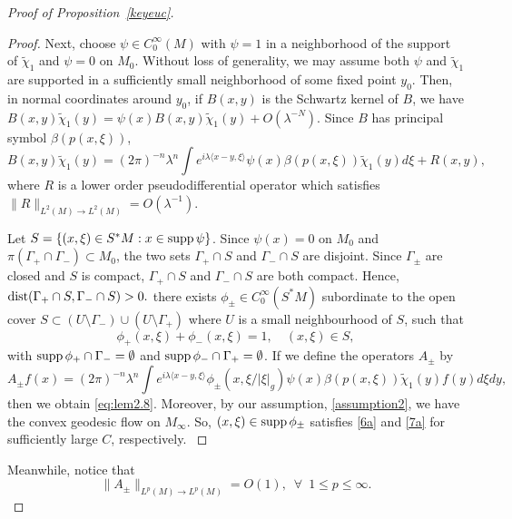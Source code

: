 \documentclass[11pt]{amsart}
\newcommand{\la}{\lambda}
\begin{document}
\begin{proof}[Proof of Proposition~\ref{keyeuc}]
\begin{proof}
Next, choose $\psi\in C_0^\infty{(M)}$ with $\psi=1$ in a neighborhood of the support of $\tilde\chi_1$  and $\psi=0$ on $M_0$. Without loss of generality, we may assume both $\psi$ and $\tilde \chi_1$ are supported in a sufficiently small neighborhood of some fixed point $y_0$. Then, in normal coordinates around $y_0$, if $B(x,y)$ is the {Schwartz} kernel of $B$, 
we have $B(x,y)\tilde\chi_1(y)=\psi(x)B(x,y)\tilde \chi_1(y)+O(\la^{-N})$. {Since $B$ has principal symbol $\beta(p(x,\xi))$},
\begin{equation}\label{2.95a}
    B(x,y)\tilde\chi_1(y)=(2\pi)^{-n}\la^n\int e^{i\la\langle x-y,\xi \rangle} \psi(x){\beta(p(x,\xi))}\tilde\chi_1(y)d\xi +R(x,y),
\end{equation}
where $R$ is a lower order {pseudodifferential} operator which satisfies $ \|R\|_{L^2(M)\to L^2(M)}=O(\la^{-1})
$.

{Let $S=\{(x,\xi)\in S^*M: x\in \textnormal{supp}\,\psi \}$. 
Since $\psi(x)=0$ on $M_0$ and $\pi(\Gamma_+\cap \Gamma_-)\subset M_0$, the two sets $\Gamma_+\cap S$ and $\Gamma_-\cap S$ are disjoint. Since $\Gamma_\pm$ are closed and $S$ is compact, $\Gamma_+\cap S$ and $\Gamma_-\cap S$ are both compact. Hence, $\textnormal{dist}(\Gamma_+\cap S,\Gamma_-\cap S)>0.$
there exists $\phi_{\pm}\in C_0^{\infty}(S^*M)$ subordinate to the open cover $S\subset (U\setminus \Gamma_-)\cup (U\setminus \Gamma_+)$ where $U$ is a small neighbourhood of $S$, such that
\begin{equation}
    \phi_+(x,\xi) +\phi_-(x,\xi) =1,\quad (x,\xi)\in S,
\end{equation}
with $\textnormal{supp}\,\phi_+ \cap \Gamma_-=\emptyset$ 
 and $\textnormal{supp}\,\phi_- \cap \Gamma_+=\emptyset$. If we define the operators $A_\pm$ by 
\begin{equation}\label{10}
   A_\pm f(x)=(2\pi)^{-n}\la^n\int e^{i\la\langle x-y,\xi \rangle} \phi_{\pm}(x,\xi/|\xi|_g)\psi(x)\beta(p(x,\xi))\tilde\chi_1(y) f(y)d\xi dy,
\end{equation}
then we obtain \eqref{eq:lem2.8}. Moreover, by our assumption, \eqref{assumption2}, we have the convex geodesic flow on $M_\infty$. So,  $(x,\xi)\in \textnormal{supp} \, \phi_{\pm}$ satisfies \eqref{6a} and \eqref{7a} for sufficiently large $C$, respectively.
}
\end{proof}
Meanwhile, notice that
\begin{equation}\label{bbound}
    \|A_\pm\|_{L^p(M)\to L^p(M)}=O(1),\,\,\,\forall\,\,\,1\le p\le \infty.
\end{equation}



\end{proof}
\end{document}
